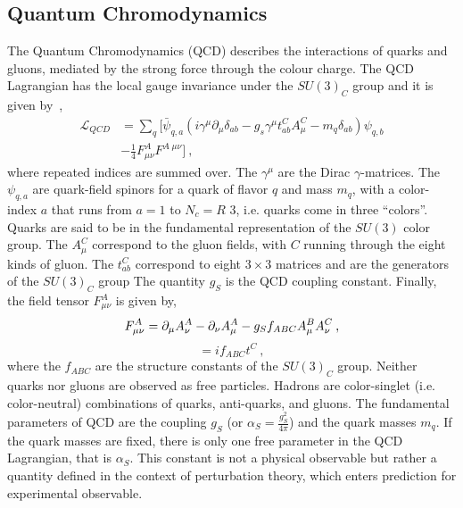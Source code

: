 \subsection*{Quantum Chromodynamics}
The Quantum Chromodynamics (QCD) describes  the interactions of quarks and gluons, mediated by
the strong force through the colour charge.  
The QCD Lagrangian has the local gauge invariance under the  $SU(3)_C$ group and it is given by~\cite{Beringer:1900zz},
\newline
\begin{equation}
\begin{split}
 \mathcal{L}_{QCD}&= \sum_q [\bar{\psi}_{q,a} ( i \gamma^{\mu} \partial_{\mu} \delta_{ab} -g_s \gamma^{\mu} t_{ab}^C A_{\mu}^C -m_q \delta_{ab})\psi_{q,b} \\
&-\frac{1}{4} F_{\mu \nu}^{A}  F^{A \; \mu \nu}] \: , \end{split}  \end{equation}
\newline
where repeated indices are summed over. The $\gamma^{\mu}$ are the Dirac $\gamma$-matrices.
The $\psi_{q,a}$ are quark-field spinors for a quark of flavor $q$ and mass $m_q$, with a color-index $a$
that runs from $a= 1$ to $N_c=R$ 3, i.e. quarks come in three ``colors''. 
Quarks are said to be in the fundamental representation of the $SU(3)$ color group. 
The $A_{\mu}^C$ correspond to the gluon fields, with $C$ running through the eight kinds of gluon.
The $t_{ab}^C$ correspond to eight $3\times 3$ matrices and are the generators of the $SU(3)_C$ group
The quantity $g_S$ is the QCD coupling constant. Finally,
the field tensor $ F_{\mu \nu}^{A}$ is given by,
\newline
\begin{equation}
 F_{\mu \nu}^{A}=  \partial_{\mu} A_{\nu}^A  - \partial_{\nu} A_{\mu}^A -g_{\Large S} f_{ABC}A_{\mu}^B A_{\nu}^C  \: ,   \end{equation}
\begin{equation}
 [t^A, t^B]=i f_{ABC}t^C  \: ,   \end{equation}
\newline
where the $f_{ABC}$ are the structure constants of the $SU(3)_C$ group.
Neither quarks nor gluons are observed as free particles. Hadrons are color-singlet (i.e. color-neutral) combinations of quarks, anti-quarks, and gluons.
The fundamental parameters of QCD are the coupling $g_S$ (or $\alpha_S= \frac{g_S^2}{4\pi}$) and the quark masses $m_q$.
If the quark masses are fixed, there is only one free parameter in the QCD Lagrangian, that is $\alpha_S$. This constant is not a physical observable but
rather  a quantity defined in the context of perturbation theory, which enters prediction for experimental observable.


